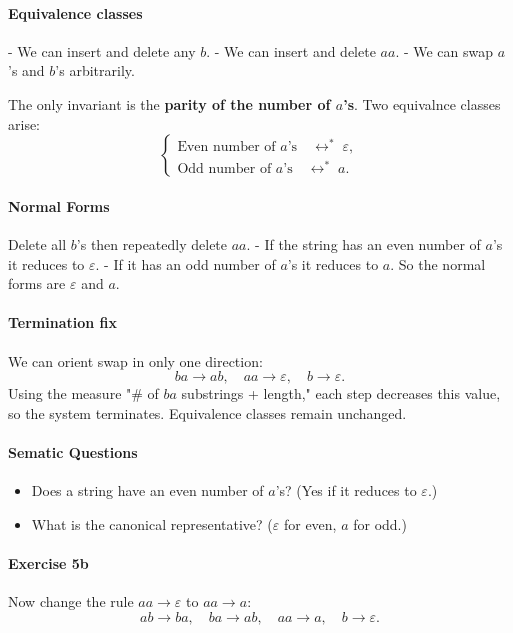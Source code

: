 \documentclass{article}
\theoremstyle{theorem}
\theoremstyle{definition}
\theoremstyle{remark}
\begin{document}
\paragraph{Equivalence classes}
- We can insert and delete any $b$.
- We can insert and delete $aa$.
- We can swap $a$'s and $b$'s arbitrarily.

The only invariant is the \textbf {parity of the number of $a$'s}.
Two equivalnce classes arise:
\[
\begin{cases}
\text{Even number of $a$’s} \quad \leftrightarrow^* \; \varepsilon, \\
\text{Odd number of $a$’s}  \quad \leftrightarrow^* \; a.
\end{cases}
\]

\paragraph{Normal Forms}
Delete all $b$'s then repeatedly delete $aa$.
- If the string has an even number of $a$'s it reduces to $\varepsilon$.
- If it has an odd number of $a$'s it reduces to $a$.
So the normal forms are $\varepsilon$ and $a$.

\paragraph{Termination fix}
We can orient swap in only one direction:
\[
ba \to ab, \quad aa \to \varepsilon, \quad b \to \varepsilon.
\]
Using the measure "\# of $ba$ substrings + length," each step decreases this value, so the system terminates.
Equivalence classes remain unchanged.

\paragraph{Sematic Questions}
\begin{itemize}
  \item Does a string have an even number of $a$'s? (Yes if it reduces to $\varepsilon$.)
  \item What is the canonical representative? ($\varepsilon$ for even, $a$ for odd.)
\end{itemize}

\paragraph{Exercise 5b}
Now change the rule $aa \to \varepsilon$ to $aa \to a$:
\[
ab \to ba, \quad
ba \to ab, \quad
aa \to a, \quad
b \to \varepsilon.
\]
\end{document}
